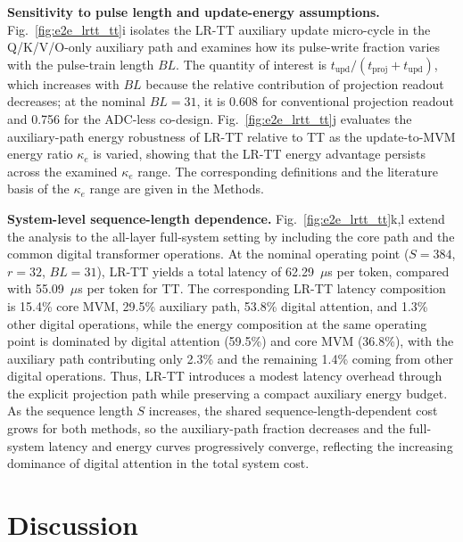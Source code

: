 \documentclass[fleqn,10pt]{wlscirep}
\begin{document}
\noindent\textbf{Sensitivity to pulse length and update-energy assumptions.}
Fig.~\ref{fig:e2e_lrtt_tt}i isolates the LR-TT auxiliary update micro-cycle in the Q/K/V/O-only auxiliary path and examines how its pulse-write fraction varies with the pulse-train length \(BL\). The quantity of interest is \(t_{\mathrm{upd}}/(t_{\mathrm{proj}}+t_{\mathrm{upd}})\), which increases with \(BL\) because the relative contribution of projection readout decreases; at the nominal \(BL=31\), it is 0.608 for conventional projection readout and 0.756 for the ADC-less co-design. Fig.~\ref{fig:e2e_lrtt_tt}j evaluates the auxiliary-path energy robustness of LR-TT relative to TT as the update-to-MVM energy ratio \(\kappa_e\) is varied, showing that the LR-TT energy advantage persists across the examined \(\kappa_e\) range. The corresponding definitions and the literature basis of the \(\kappa_e\) range are given in the Methods.

\noindent\textbf{System-level sequence-length dependence.}
Fig.~\ref{fig:e2e_lrtt_tt}k,l extend the analysis to the all-layer full-system setting by including the core path and the common digital transformer operations. At the nominal operating point (\(S=384\), \(r=32\), \(BL=31\)), LR-TT yields a total latency of 62.29~\(\mu\)s per token, compared with 55.09~\(\mu\)s per token for TT. The corresponding LR-TT latency composition is 15.4\% core MVM, 29.5\% auxiliary path, 53.8\% digital attention, and 1.3\% other digital operations, while the energy composition at the same operating point is dominated by digital attention (59.5\%) and core MVM (36.8\%), with the auxiliary path contributing only 2.3\% and the remaining 1.4\% coming from other digital operations. Thus, LR-TT introduces a modest latency overhead through the explicit projection path while preserving a compact auxiliary energy budget. As the sequence length \(S\) increases, the shared sequence-length-dependent cost grows for both methods, so the auxiliary-path fraction decreases and the full-system latency and energy curves progressively converge, reflecting the increasing dominance of digital attention in the total system cost.

\section{Discussion}
\label{sec:discussion}
\end{document}
